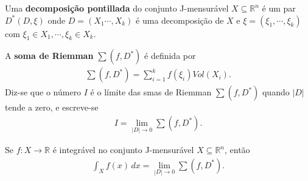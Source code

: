 \begin{note}
  Uma \textbf{decomposição pontillada} do conjunto J-mensurável $X\subseteq\mathbb{R}^{n}$ é um par $D^{\ast}(D,\xi)$ onde $D=(X_1\cdots,X_k)$ é uma decomposição de $X$ e $\xi=(\xi_1,\cdots,\xi_k)$ com $\xi_1\in X_1,\cdots,\xi_k\in X_k$. 
\end{note}
\begin{definition}
  A \textbf{soma de Riemman} $\sum (f,D^{\ast})$ é definida por
  \begin{align*}
    \sum(f,D^{\ast})=\sum_{i=1}^{k}f(\xi_i)Vol(X_i).
  \end{align*}
  Diz-se que o  número $I$ é o límite das smas de Riemman $\sum (f,D^{\ast})$ quando $|D|$ tende a zero, e escreve-se
  \begin{align*}
    I=\lim_{|D| \to 0}\sum (f,D^{\ast}).
  \end{align*}
\end{definition}
\begin{theorem}
  Se $f:X\to\mathbb{R}$ é integrável no conjunto J-mensurável $X\subseteq\mathbb{R}^{n}$, então
  \begin{align*}
    \int_{X}f(x)\,dx=\lim_{|D| \to 0}\sum (f,D^{\ast}).
  \end{align*}
\end{theorem}
